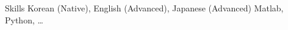 
\begin{rubric}{Skills}
	Korean (Native), English (Advanced), Japanese (Advanced)
	Matlab, Python, \ldots
\end{rubric}
